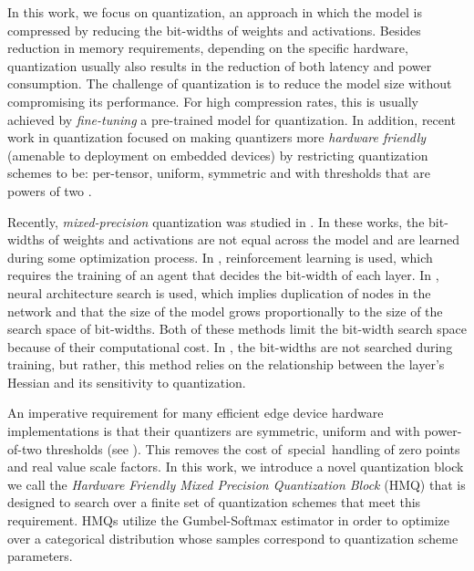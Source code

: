 \documentclass{article}
\newcommand{\qb}{HMQ}
\begin{document}
In this work, we focus on quantization, an approach in which the model is compressed by reducing the bit-widths of weights and activations.
Besides reduction in memory requirements, depending on the specific hardware, quantization usually also results in the reduction of both latency and power consumption.
The challenge of quantization is to reduce the model size without compromising its performance. 
For high compression rates, this is usually achieved by \emph{fine-tuning} a pre-trained model for quantization. 
In addition, recent work in quantization focused on making quantizers more \textit{hardware friendly} (amenable to deployment on embedded devices) by restricting quantization schemes to be: per-tensor, uniform, symmetric and with thresholds that are powers of two \cite{jain2019trained,Uhlich2020Mixed}.


Recently, \emph{mixed-precision} quantization was studied in \cite{dong2019hawq,Uhlich2020Mixed,wang2019haq,wu2018mixed}.
In these works, the bit-widths of weights and activations are not equal across the model and are learned during some optimization process.
In \cite{wang2019haq}, reinforcement learning is used, which requires the training of an agent that decides the bit-width of each layer.
In \cite{wu2018mixed}, neural architecture search is used, which implies duplication of nodes in the network and that the size of the model grows proportionally to the size of the search space of bit-widths.
Both of these methods limit the bit-width search space because of their computational cost.
In \cite{dong2019hawq}, the bit-widths are not searched during training, but rather, this method relies on the relationship between the layer's Hessian and its sensitivity to quantization.

An imperative requirement for many efficient edge device hardware implementations is that their quantizers are symmetric, uniform and with power-of-two thresholds (see \cite{jain2019trained}). 
This removes the cost of special handling of zero points and real value scale factors.
In this work, we introduce a novel quantization block we call the \textit{Hardware Friendly Mixed Precision Quantization Block} (\qb) that is designed to search over a finite set of quantization schemes that meet this requirement. 
\qb s utilize the Gumbel-Softmax estimator \cite{jang2016categorical} in order to optimize over a categorical distribution whose samples correspond to quantization scheme parameters.
\end{document}
